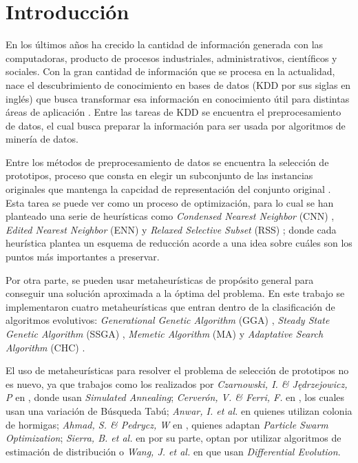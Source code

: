\chapter*{Introducción}
\label{intro}

En los últimos años ha crecido la cantidad de información generada con las computadoras, producto de procesos industriales, administrativos, científicos y sociales. Con la gran cantidad de información que se procesa en la actualidad, nace el descubrimiento de conocimiento en bases de datos (KDD por sus siglas en inglés) que busca transformar esa información en conocimiento útil para distintas áreas de aplicación \cite{han2011data}. Entre las tareas de KDD se encuentra el preprocesamiento de datos, el cual busca preparar la información para ser usada por algoritmos de minería de datos. 

Entre los métodos de preprocesamiento de datos se encuentra la selección de prototipos, proceso que consta en elegir un subconjunto de las instancias originales que mantenga la capcidad de representación del conjunto original \cite{garcia2016data}. Esta tarea se puede ver como un proceso de optimización, para lo cual se han planteado una serie de heurísticas como \emph{Condensed Nearest Neighbor} (CNN) \cite{hart1968condensed}, \emph{Edited Nearest Neighbor} (ENN) \cite{wilson1972asymptotic} y \emph{Relaxed Selective Subset} (RSS) \cite{floresnearest}; donde cada heurística plantea un esquema de reducción acorde a una idea sobre cuáles son los puntos más importantes a preservar.

Por otra parte, se pueden usar metaheurísticas de propósito general para conseguir una solución aproximada a la óptima del problema. En este trabajo se implementaron cuatro metaheurísticas que entran dentro de la clasificación de algoritmos evolutivos: \emph{Generational Genetic Algorithm} (GGA) \cite{holland1975adaptation}, \emph{Steady State Genetic Algorithm} (SSGA) \cite{talbi2009metaheuristics}, \emph{Memetic Algorithm} (MA) \cite{neri2012memetic} y \emph{Adaptative Search Algorithm} (CHC) \cite{eshelman1991chc}.

El uso de metaheurísticas para resolver el problema de selección de prototipos no es nuevo, ya que trabajos como los realizados por \emph{Czarnowski, I. \& J{\k{e}}drzejowicz, P} en \cite{czarnowski2011application}, donde usan \emph{Simulated Annealing}; \emph{Cerverón, V. \& Ferri, F.} en \cite{cerveron2001another}, los cuales usan una variación de Búsqueda Tabú; \emph{Anwar, I. et al.} en \cite{anwar2015instance,anwar2015adr} quienes utilizan colonia de hormigas; \emph{Ahmad, S. \& Pedrycz, W} en \cite{ahmad2011feature}, quienes adaptan \emph{Particle Swarm Optimization}; \emph{Sierra, B. et al.} en \cite{sierra2001prototype} por su parte, optan por utilizar algoritmos de estimación de distribución o \emph{Wang, J. et al.} en \cite{wang2016differential} que usan \emph{Differential Evolution}. 

